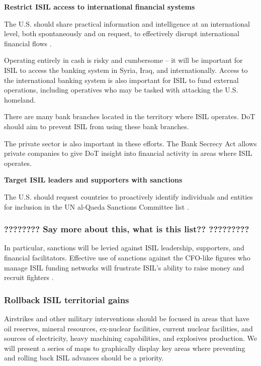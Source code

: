 \documentclass{report}
\begin{document}
\textbf{Restrict ISIL access to international financial systems}

The U.S. should share practical information and intelligence at an international level, both spontaneously and on request, to effectively disrupt international financial flows \cite{Report2015}.

Operating entirely in cash is risky and cumbersome – it will be important for ISIL to access the banking system in Syria, Iraq, and internationally. Access to the international banking system is also important for ISIL to fund external operations, including operatives who may be tasked with attacking the U.S. homeland. 

There are many bank branches located in the territory where ISIL operates. DoT should aim to prevent ISIL from using these bank branches. 

The private sector is also important in these efforts. The Bank Secrecy Act allows private companies to give DoT insight into financial activity in areas where ISIL operates. 

\textbf{Target ISIL leaders and supporters with sanctions}

The U.S. should request countries to proactively identify individuals and entities for inclusion in the UN al-Qaeda Sanctions Committee list \cite{Report2015}.

 \subsubsection{???????? Say more about this, what is this list??   ?????????}

In particular, sanctions will be levied against ISIL leadership, supporters, and financial facilitators. Effective use of sanctions against the CFO-like figures who manage ISIL funding networks will frustrate ISIL's ability to raise money and recruit fighters \cite{Cohen2014}.

\subsubsection{Rollback ISIL territorial gains}

Airstrikes and other military interventions should be focused in areas that have oil reserves, mineral resources, ex-nuclear facilities, current nuclear facilities, and sources of electricity, heavy machining capabilities, and explosives production. We will present a series of maps to graphically display key areas where preventing and rolling back ISIL advances should be a priority.
\end{document}
